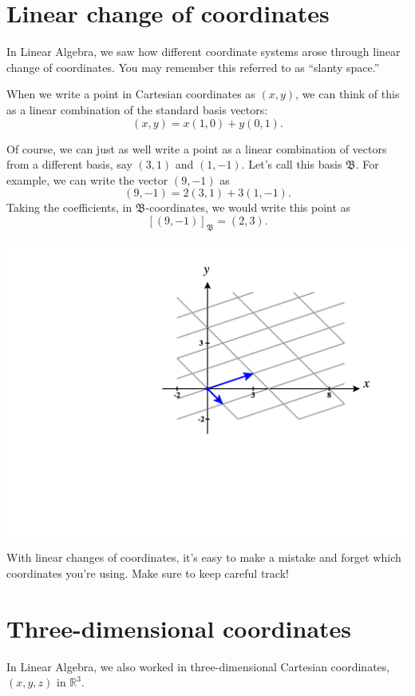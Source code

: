 \documentclass{ximera}
\begin{document}
\section*{Linear change of coordinates}

In Linear Algebra, we saw how different coordinate systems arose through linear change of coordinates. You may remember this referred to as ``slanty space.''

When we write a point in Cartesian coordinates as $(x,y)$, we can think of this as a linear combination of the standard basis vectors:
\[
(x,y) = x(1,0) + y(0,1).
\]

Of course, we can just as well write a point as a linear combination of vectors from a different basis, say $(3,1)$ and $(1, -1)$. Let's call this basis $\mathfrak{B}$. For example, we can write the vector $(9,-1)$ as
\[
(9,-1) = 2(3,1)+3(1,-1).
\]
Taking the coefficients, in $\mathfrak{B}$-coordinates, we would write this point as
\[
[(9,-1)]_{\mathfrak{B}}=(2,3).
\]

\begin{image}
\includegraphics[width=\textwidth]{CalcPlot3D-slanty_space}
\end{image}

With linear changes of coordinates, it's easy to make a mistake and forget which coordinates you're using. Make sure to keep careful track!

\section*{Three-dimensional coordinates}

In Linear Algebra, we also worked in three-dimensional Cartesian coordinates, $(x,y,z)$ in $\mathbb{R}^3$.
\end{document}
